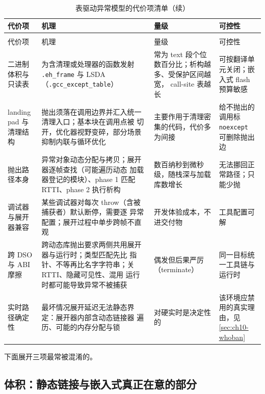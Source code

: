 \documentclass[12pt,a4paper,fontset=fandol]{ctexbook}
\newcommand{\Tp}[1]{\texttt{#1}}
\newcommand{\Bk}{\discretionary{}{}{}}
\begin{document}
\begin{longtable}{>{\raggedright\arraybackslash}p{}
                  >{\raggedright\arraybackslash}p{}
                  >{\raggedright\arraybackslash}p{}
                  >{\raggedright\arraybackslash}p{}}
\caption{表驱动异常模型的代价项清单。量级为典型经验区间；
评审时应以本项目实测为准。}\label{tab:ch10-paylist}\\
\toprule
代价项 & 机理 & 量级 & 可控性 \\
\midrule
\endfirsthead
\caption{表驱动异常模型的代价项清单（续）}\\
\toprule
代价项 & 机理 & 量级 & 可控性 \\
\midrule
\endhead
\midrule
\bottomrule
\endfoot
二进制体积与只读表 &
  为含清理或处理器的函数发射 \Tp{.eh\_frame} 与 LSDA
  （\Tp{.gcc{\Bk}\_except{\Bk}\_table}）&
  常为 text 段个位数百分比；析构越多、受保护区间越宽，
  call-site 表越长 &
  可按翻译单元关闭；嵌入式 flash 预算敏感
\\
landing pad 与清理结构 &
  抛出须落在调用边界并汇入统一清理入口；基本块在调用点被
  切开，优化器视野变碎，部分场景抑制内联与循环优化 &
  主要作用于清理密集的代码，代价多为间接 &
  给不抛出的调用标 \Tp{noexcept} 可删除抛出边
\\
抛出路径本身 &
  异常对象动态分配与拷贝；展开器逐帧查找（可能遍历动态
  加载器登记的模块）、phase 1 匹配 RTTI、phase 2 执行析构 &
  数百纳秒到微秒级，随栈深与加载库数增长 &
  无法挪回正常路径；只能少抛
\\
调试器与展开器兼容 &
  某些调试器对每次 throw（含被捕获者）默认断停，需要逐
  异常配置；展开过程中单步跨帧不直观 &
  开发体验成本，不进交付物 &
  工具配置可解
\\
跨 DSO 与 ABI 摩擦 &
  跨动态库抛出要求两侧共用展开器与运行时；类型匹配先比
  指针、不等再比名字字符串；关 RTTI、隐藏可见性、混用
  运行时都可能导致异常不被捕获 &
  偶发但后果严厉（terminate） &
  同一目标统一工具链与运行时
\\
实时路径确定性 &
  最坏情况展开延迟无法静态界定：展开器内部含动态链接器
  遍历、可能的内存分配与锁 &
  对硬实时是决定性的 &
  该环境应禁用的真实理由，见 \ref{sec:ch10-whoban}
\\
\end{longtable}

下面展开三项最常被混淆的。

\subsection*{体积：静态链接与嵌入式真正在意的部分}
\end{document}
